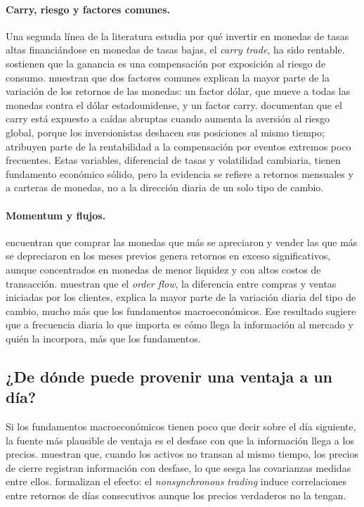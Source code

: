 \documentclass[11pt,a4paper]{article}
\begin{document}
\paragraph{Carry, riesgo y factores comunes.} Una segunda línea de la literatura estudia por qué invertir en monedas de tasas altas financiándose en monedas de tasas bajas, el \emph{carry trade}, ha sido rentable. \citet{lustig2007} sostienen que la ganancia es una compensación por exposición al riesgo de consumo. \citet{lustig2011} muestran que dos factores comunes explican la mayor parte de la variación de los retornos de las monedas: un factor dólar, que mueve a todas las monedas contra el dólar estadounidense, y un factor carry. \citet{brunnermeier2008} documentan que el carry está expuesto a caídas abruptas cuando aumenta la aversión al riesgo global, porque los inversionistas deshacen sus posiciones al mismo tiempo; \citet{burnside2011} atribuyen parte de la rentabilidad a la compensación por eventos extremos poco frecuentes. Estas variables, diferencial de tasas y volatilidad cambiaria, tienen fundamento económico sólido, pero la evidencia se refiere a retornos mensuales y a carteras de monedas, no a la dirección diaria de un solo tipo de cambio.

\paragraph{Momentum y flujos.} \citet{menkhoff2012} encuentran que comprar las monedas que más se apreciaron y vender las que más se depreciaron en los meses previos genera retornos en exceso significativos, aunque concentrados en monedas de menor liquidez y con altos costos de transacción. \citet{evans2002} muestran que el \emph{order flow}, la diferencia entre compras y ventas iniciadas por los clientes, explica la mayor parte de la variación diaria del tipo de cambio, mucho más que los fundamentos macroeconómicos. Ese resultado sugiere que a frecuencia diaria lo que importa es cómo llega la información al mercado y quién la incorpora, más que los fundamentos.

\subsection{¿De dónde puede provenir una ventaja a un día?}

Si los fundamentos macroeconómicos tienen poco que decir sobre el día siguiente, la fuente más plausible de ventaja es el desfase con que la información llega a los precios. \citet{scholes1977} muestran que, cuando los activos no transan al mismo tiempo, los precios de cierre registran información con desfase, lo que sesga las covarianzas medidas entre ellos. \citet{lo1990} formalizan el efecto: el \emph{nonsynchronous trading} induce correlaciones entre retornos de días consecutivos aunque los precios verdaderos no la tengan.
\end{document}
